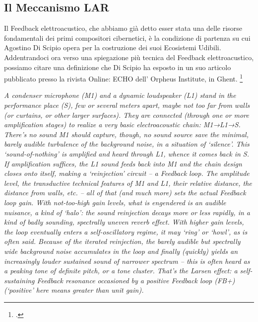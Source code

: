 \subsection{Il Meccanismo LAR}
\label{sec:Il Meccanismo LAR}
Il Feedback elettroacustico, che abbiamo già detto
esser stata una delle risorse fondamentali dei primi compositori cibernetici,
è la condizione di partenza su cui Agostino Di Scipio opera per la costruzione dei suoi Ecosistemi Udibili.
Addentrandoci ora verso una spiegazione più tecnica del Feedback elettroacustico,
possiamo citare una definizione che Di Scipio ha esposto in un suo articolo
pubblicato presso la rivista Online: ECHO dell’ Orpheus Institute, in
Ghent. \footcite{di_scipio_relational_2022}

\begin{center}
\vspace{0.5cm}
\textit{A condenser microphone (M1) and a dynamic loudspeaker (L1) stand in the performance place
(S), few or several meters apart, maybe not too far from walls (or curtains, or other larger
surfaces). They are connected (through one or more amplification stages) to realize a very
basic electroacoustic chain: M1→L1→S. There’s no sound M1 should capture, though, no sound
source save the minimal, barely audible turbulence of the background noise, in a situation of
‘silence’. This ‘sound-of-nothing’ is amplified and heard through L1, whence it comes back in
S. \\
If amplification suffices, the L1 sound feeds back into M1 and the chain design closes onto
itself, making a ‘reinjection’ circuit – a Feedback loop. The amplitude level, the
transductive technical features of M1 and L1, their relative distance, the distance from
walls, etc. – all of that (and much more) sets the actual Feedback loop gain. With
not-too-high gain levels, what is engendered is an audible nuisance, a kind of ‘halo’: the
sound reinjection decays more or less rapidly, in a kind of badly sounding, spectrally uneven
reverb effect. With higher gain levels, the loop eventually enters a self-oscillatory regime,
it may ‘ring’ or ‘howl’, as is often said. Because of the iterated reinjection, the barely
audible but spectrally wide background noise accumulates in the loop and finally (quickly)
yields an increasingly louder sustained sound of narrower spectrum – this is often heard as a
peaking tone of definite pitch, or a tone cluster. That’s the Larsen effect: a self-sustaining
Feedback resonance occasioned by a positive Feedback loop (FB+) (‘positive’ here means greater
than unit gain).}
\vspace{0.5cm}
\vspace{0.5cm}
\end{center}

